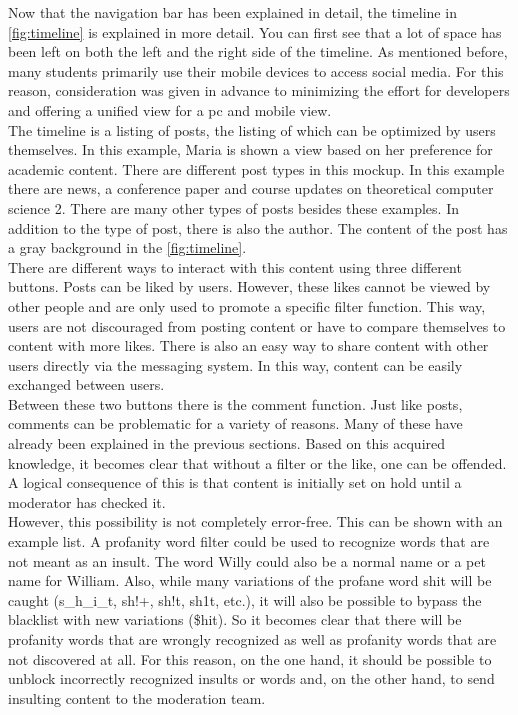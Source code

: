 Now that the navigation bar has been explained in detail, the timeline in \autoref{fig:timeline} is explained in more detail.
You can first see that a lot of space has been left on both the left and the right side of the timeline.
As mentioned before, many students primarily use their mobile devices to access social media.
For this reason, consideration was given in advance to minimizing the effort for developers and offering a unified view for a pc and mobile view.\\

The timeline is a listing of posts, the listing of which can be optimized by users themselves.
In this example, Maria is shown a view based on her preference for academic content.
There are different post types in this mockup.
In this example there are news, a conference paper and course updates on theoretical computer science 2.
There are many other types of posts besides these examples.
In addition to the type of post, there is also the author.
The content of the post has a gray background in the \autoref{fig:timeline}.\\

There are different ways to interact with this content using three different buttons.
Posts can be liked by users.
However, these likes cannot be viewed by other people and are only used to promote a specific filter function.
This way, users are not discouraged from posting content or have to compare themselves to content with more likes.
There is also an easy way to share content with other users directly via the messaging system.
In this way, content can be easily exchanged between users.\\

Between these two buttons there is the comment function.
Just like posts, comments can be problematic for a variety of reasons.
Many of these have already been explained in the previous sections.
Based on this acquired knowledge, it becomes clear that without a filter or the like, one can be offended.
A logical consequence of this is that content is initially set on hold until a moderator has checked it.\\

However, this possibility is not completely error-free.
This can be shown with an example list\cite{profanity-list}.
A profanity word filter could be used to recognize words that are not meant as an insult.
The word Willy could also be a normal name or a pet name for William.
Also, while many variations of the profane word shit will be caught (s\_h\_i\_t, sh!+, sh!t, sh1t, etc.), it will also be possible to bypass the blacklist with new variations (\$hit).
So it becomes clear that there will be profanity words that are wrongly recognized as well as profanity words that are not discovered at all.
For this reason, on the one hand, it should be possible to unblock incorrectly recognized insults or words and, on the other hand, to send insulting content to the moderation team.\\


